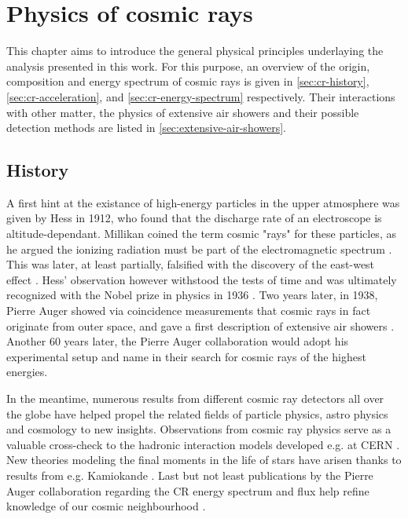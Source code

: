 
\chapter{Physics of cosmic rays}
\label{chap:physical-background}

This chapter aims to introduce the general physical principles underlaying the analysis presented in this work. For this purpose, an overview of the origin, 
composition and energy spectrum of cosmic rays is given in \autoref{sec:cr-history}, \autoref{sec:cr-acceleration}, and \autoref{sec:cr-energy-spectrum} 
respectively. Their interactions with other matter, the physics of extensive air showers and their possible detection methods are listed in 
\autoref{sec:extensive-air-showers}.

\section{History}
\label{sec:cr-history}

A first hint at the existance of high-energy particles in the upper atmosphere was given by Hess in 1912, who found that the discharge rate of an electroscope is 
altitude-dependant. Millikan coined the term cosmic "rays" for these particles, as he argued the ionizing radiation must be part of the electromagnetic spectrum 
\cite{millikan1928origin}. This was later, at least partially, falsified with the discovery of the east-west effect \cite{johnson1938note}. Hess' observation 
however withstood the tests of time and was ultimately recognized with the Nobel prize in physics in 1936 \cite{nobelprize1936}. Two years later, in 1938, Pierre 
Auger showed via coincidence measurements that cosmic rays in fact originate from outer space, and gave a first description of extensive air showers 
\cite{auger1939extensive}. Another 60 years later, the Pierre Auger collaboration would adopt his experimental setup and name in their search for cosmic rays of 
the highest energies.

In the meantime, numerous results from different cosmic ray detectors all over the globe have helped propel the related fields of particle physics, astro physics 
and cosmology to new insights. Observations from cosmic ray physics serve as a valuable cross-check to the hadronic interaction models developed e.g. at CERN 
\cite{ostapchenko2007status}. New theories modeling the final moments in the life of stars have arisen thanks to results from e.g. Kamiokande 
\cite{goldman1988implications}. Last but not least publications by the Pierre Auger collaboration regarding the CR energy spectrum and flux help refine knowledge of 
our cosmic neighbourhood \cite{abraham2010measurement, aab2015searches}.

